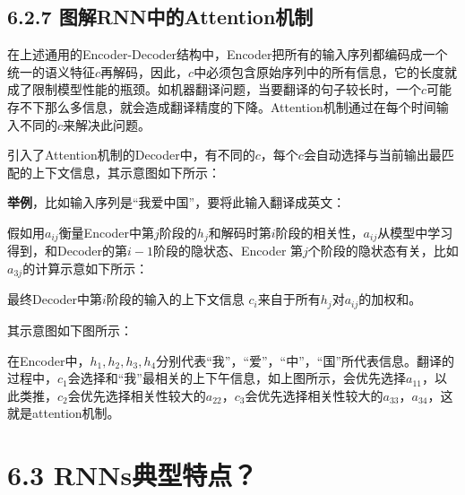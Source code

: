 \subsection{6.2.7
图解RNN中的Attention机制}\label{ux56feux89e3rnnux4e2dux7684attentionux673aux5236}

​
在上述通用的Encoder-Decoder结构中，Encoder把所有的输入序列都编码成一个统一的语义特征\(c​\)再解码，因此，\(c​\)中必须包含原始序列中的所有信息，它的长度就成了限制模型性能的瓶颈。如机器翻译问题，当要翻译的句子较长时，一个\(c​\)可能存不下那么多信息，就会造成翻译精度的下降。Attention机制通过在每个时间输入不同的\(c​\)来解决此问题。

​
引入了Attention机制的Decoder中，有不同的\(c\)，每个\(c​\)会自动选择与当前输出最匹配的上下文信息，其示意图如下所示：


​ \textbf{举例}，比如输入序列是``我爱中国''，要将此输入翻译成英文：

​
假如用\(a_{ij}\)衡量Encoder中第\(j\)阶段的\(h_j\)和解码时第\(i\)阶段的相关性，\(a_{ij}\)从模型中学习得到，和Decoder的第\(i-1\)阶段的隐状态、Encoder
第\(j\)个阶段的隐状态有关，比如\(a_{3j}​\)的计算示意如下所示：


最终Decoder中第\(i\)阶段的输入的上下文信息
\(c_i\)来自于所有\(h_j\)对\(a_{ij}\)的加权和。

其示意图如下图所示：


​
在Encoder中，\(h_1,h_2,h_3,h_4\)分别代表``我''，``爱''，``中''，``国''所代表信息。翻译的过程中，\(c_1\)会选择和``我''最相关的上下午信息，如上图所示，会优先选择\(a_{11}\)，以此类推，\(c_2\)会优先选择相关性较大的\(a_{22}\)，\(c_3\)会优先选择相关性较大的\(a_{33}，a_{34}\)，这就是attention机制。

\section{6.3 RNNs典型特点？}\label{rnnsux5178ux578bux7279ux70b9}

